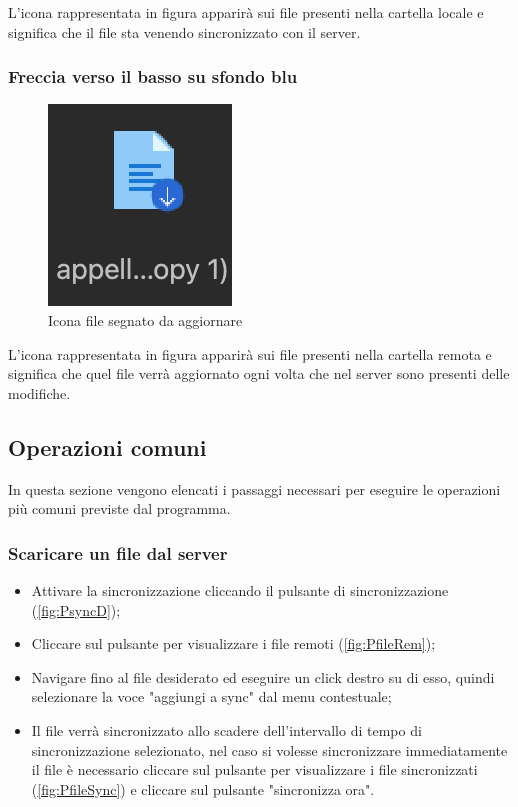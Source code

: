 L'icona rappresentata in figura apparirà sui file presenti nella cartella locale e significa che il file sta venendo sincronizzato con il server.

\subsubsection{Freccia verso il basso su sfondo blu}

\begin{figure}[H]
    \centering
    \includegraphics[scale = 0.8]{components/img/iconUpdate.png}
    \caption{Icona file segnato da aggiornare}
    \label{fig:greenI}
\end{figure}


L'icona rappresentata in figura apparirà sui file presenti nella cartella remota e significa che quel file verrà aggiornato ogni volta che nel server sono presenti delle modifiche.

\subsection{Operazioni comuni}
In questa sezione vengono elencati i passaggi necessari per eseguire le operazioni più comuni previste dal programma.
\subsubsection{Scaricare un file dal server}
\begin{itemize}
\item Attivare la sincronizzazione cliccando il pulsante di sincronizzazione (\ref{fig:PsyncD});
\item Cliccare sul pulsante per visualizzare i file remoti (\ref{fig:PfileRem});
\item Navigare fino al file desiderato ed eseguire un click destro su di esso, quindi selezionare la voce "aggiungi a sync" dal menu contestuale;
\item Il file verrà sincronizzato allo scadere dell'intervallo di tempo di sincronizzazione selezionato, nel caso si volesse sincronizzare immediatamente il file è necessario cliccare sul pulsante per visualizzare i file sincronizzati (\ref{fig:PfileSync}) e cliccare sul pulsante "sincronizza ora".
\end{itemize}
